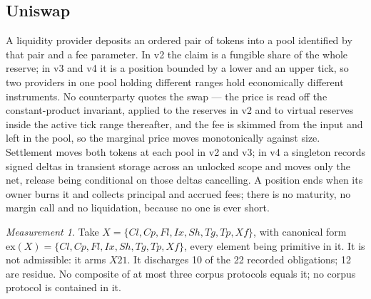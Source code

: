 \documentclass[11pt,reqno]{amsart}
\theoremstyle{plain}
\theoremstyle{definition}
\theoremstyle{remark}
\newtheorem{measurement}[theorem]{Measurement}
\begin{document}
\subsection{Uniswap}\label{case:dex:uniswap}

A liquidity provider deposits an ordered pair of tokens into a pool identified by that pair and a fee parameter. In v2 the claim is a fungible share of the whole reserve; in v3 and v4 it is a position bounded by a lower and an upper tick, so two providers in one pool holding different ranges hold economically different instruments. No counterparty quotes the swap --- the price is read off the constant-product invariant, applied to the reserves in v2 and to virtual reserves inside the active tick range thereafter, and the fee is skimmed from the input and left in the pool, so the marginal price moves monotonically against size. Settlement moves both tokens at each pool in v2 and v3; in v4 a singleton records signed deltas in transient storage across an unlocked scope and moves only the net, release being conditional on those deltas cancelling. A position ends when its owner burns it and collects principal and accrued fees; there is no maturity, no margin call and no liquidation, because no one is ever short.

\begin{measurement}\label{meas:case:dex:uniswap}
Take $X = \{Cl,Cp,Fl,Ix,Sh,Tg,Tp,Xf\}$, with canonical form
$\mathrm{ex}(X) = \{Cl,Cp,Fl,Ix,Sh,Tg,Tp,Xf\}$, every element being primitive in it.
It is not admissible: it arms $X21$. It discharges 10 of the 22 recorded obligations; 12 are residue. No composite of at most three corpus protocols equals it; no corpus protocol is contained in it.
\end{measurement}
\end{document}
